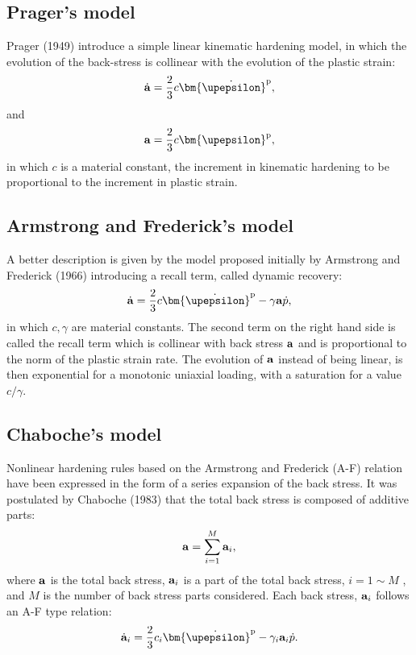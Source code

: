 \subsection{Prager's model}
\noindent
Prager (1949) \cite{prager1949recent} introduce a simple linear kinematic hardening model, in which the evolution of the back-stress is collinear with the evolution of the plastic strain:
\begin{equation}
{\dot{\bf a}} = \frac{2}{3}c{\bm{\dot \upepsilon }}^{\rm{p}},
\end{equation}
and
\begin{equation}
{\bf{ a}} = \frac{2}{3}c{\bm{ \upepsilon }}^{\rm{p}},
\end{equation}
in which $c$ is a material constant, the increment in kinematic hardening to be proportional to the increment
in plastic strain.

\subsection{Armstrong and Frederick's model}
\noindent
A better description is given by the model proposed initially by Armstrong and Frederick (1966) \cite{armstrong1966mathematical} introducing a recall term, called dynamic recovery:
\begin{equation}
{\dot {\bf a}} = \frac{2}{3}c{\bm{\dot \upepsilon }}^{\rm{p}} - \gamma {\bf{a}}\dot p,
\end{equation}
in which $c,\gamma$ are material constants.
The second term on the right hand side is called the recall term which is collinear with back stress $\bf{a}$ and is proportional to the norm of the plastic strain rate. The evolution of $\bf{a}$ instead of being linear, is then exponential for a monotonic uniaxial loading, with a saturation for a value $c/\gamma $.

\subsection{Chaboche's model}
\noindent
Nonlinear hardening rules based on the Armstrong and Frederick (A-F) relation have been expressed in the form of a series expansion of the back stress.
It was postulated by Chaboche (1983) \cite{chaboche1983plastic} that the total back stress is composed of additive parts:
\begin{equation}
{\bf{a}} = \sum\limits_{i = 1}^M {{{\bf{a}}_i}},
\end{equation}
where ${\bf{a}}$ is the total back stress, ${{{\bf{a}}_i}}$ is a part of the total back stress, $i = 1\sim M$ , and $M$ is the number of back stress parts considered. Each back stress, ${{{\bf{a}}_i}}$ follows an A-F type relation:
\begin{equation}
{{\dot{\bf a}}_i} = \frac{2}{3}{c_i}{{\bm{\dot \upepsilon }}^{\rm{p}}} - {\gamma _i}{{\bf{a}}_i}\dot p.
\end{equation}

